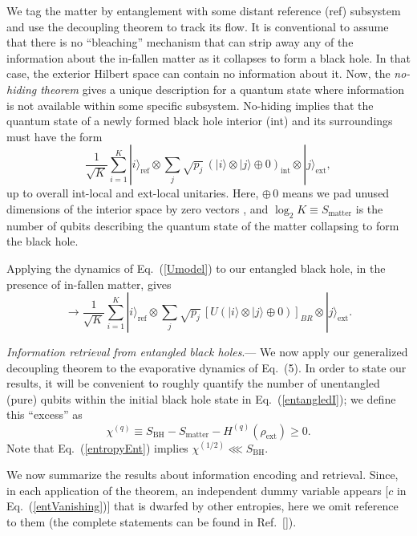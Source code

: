\documentclass[aps,showpacs,prl,12pt]{revtex4}
\begin{document}
We tag the matter by entanglement with some distant reference (ref)
subsystem \cite{me,Hayden07} and use the decoupling theorem to
track its flow. It is conventional to assume that there is no ``bleaching''
mechanism \cite{bleach} that can strip away any of the
information about the in-fallen matter as it collapses to form a
black hole. In that case, the exterior Hilbert space can contain
no information about it. Now, the {\it no-hiding theorem} \cite{me}
gives a unique description for a quantum state where information is
not available within some specific subsystem. No-hiding implies
that the quantum state of a newly formed black hole interior
(int) and its surroundings must have the form
\begin{equation}
\frac{1}{\sqrt{K}}\sum_{i=1}^K |i\rangle_{\text{ref}}\otimes
\sum_{j}\sqrt{p_j}\,(|i\rangle\otimes |j\rangle\oplus 0)_{\text{int}}
\otimes|j\rangle_{\text{ext}}, \tag{5a}\label{entangledI}
\end{equation}
up to overall int-local and ext-local unitaries. Here, $\oplus\, 0$ means
we pad unused dimensions of the interior space by zero vectors \cite{me},
and $\log_2 K\equiv S_{\text{matter}}$ is the number of qubits
describing the quantum state of the matter collapsing to form the black
hole.  

Applying the dynamics of Eq.~(\ref{Umodel}) to our entangled black hole,
in the presence of in-fallen matter, gives
\begin{equation}
\rightarrow
\frac{1}{\sqrt{K}}\sum_{i=1}^K |i\rangle_{\text{ref}}\otimes
\!\sum_{j}\sqrt{p_j}\,[U(|i\rangle\otimes |j\rangle\oplus 0)]_{BR}
\otimes|j\rangle_{\text{ext}}.
\tag{5b}\label{entangledF}
\end{equation}

{\it Information retrieval from entangled black holes}.---%
\setcounter{equation}{5}%
We now apply our generalized decoupling theorem to the
evaporative dynamics of Eq.~(5). In order to state our
results, it will be convenient to roughly quantify the number of
unentangled (pure) qubits within the initial black hole state
in Eq.~(\ref{entangledI}); we define this ``excess'' as
\begin{equation}
\chi^{(q)}\equiv S_{\text{BH}} - S_{\text{matter}}
 -H^{(q)}(\rho_{\text{ext}})\ge 0.  \label{chiq}
\end{equation}
Note that Eq.~(\ref{entropyEnt}) implies
$\chi^{(1/2)} \lll S_{\text{BH}}$.

We now summarize the results about information encoding and retrieval. 
Since, in each application of the theorem, an independent dummy variable
appears [$c$ in Eq.~(\ref{entVanishing})] that is dwarfed by
other entropies, here we omit reference to them (the complete 
statements can be found in Ref.~[]).
\end{document}
